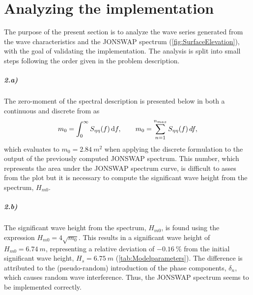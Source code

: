 \vspace{15mm}
{\let\clearpage\relax \chapter{Analyzing the implementation}}

The purpose of the present section is to analyze the wave series generated from the wave characteristics and the JONSWAP spectrum (\cref{fig:SurfaceElevation}), with the goal of validating the implementation. The analysis is split into small steps following the order given in the problem description.

\paragraph{2.a)} The zero-moment of the spectral description is presented below in both a continuous and discrete from as
\begin{equation}
    m_0 = \int_0^\infty S_{\eta \eta}(f) \dif f, \qquad m_0 = \sum_{n=1}^{n_{max}} S_{\eta\eta}(f)\,df,
\end{equation}
which evaluates to $m_0=\SI{2.84}{m^2}$ when applying the discrete formulation to the output of the previously computed JONSWAP spectrum. This number, which represents the area under the JONSWAP spectrum curve, is difficult to asses from the plot but it is necessary to compute the significant wave height from the spectrum, $H_{m0}$.
\squeezeup
\paragraph{2.b)} The significant wave height from the spectrum, $H_{m0}$, is found using the expression $H_{m0} = 4\sqrt{m_0}$. This results in a significant wave height of $H_{m0}=\SI{6.74}{m}$, representing a relative deviation of $\SI{-0.16}{\percent}$ from the initial significant wave height, $H_s=\SI{6.75}{m}$ (\cref{tab:Modelparameters}). The difference is attributed to the (pseudo-random) introduction of the phase components, $\delta_n$, which causes random wave interference. Thus, the JONSWAP spectrum seems to be implemented correctly. 

